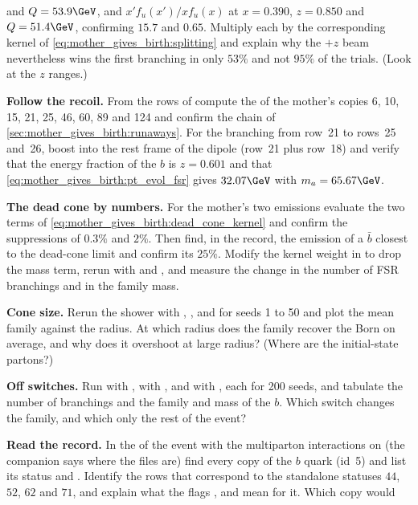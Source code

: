 \begin{exercises}
  and $Q=53.9\GeV$, and $x'f_u(x')/xf_u(x)$ at $x=0.390$, $z=0.850$ and
  $Q=51.4\GeV$, confirming $15.7$ and $0.65$. Multiply each by the
  corresponding kernel of \cref{eq:mother_gives_birth:splitting} and explain
  why the $+z$ beam nevertheless wins the first branching in only $53\%$ and
  not $95\%$ of the trials. (Look at the $z$ ranges.)
\item \textbf{Follow the recoil.} From the rows of 
  compute the \pt of the mother's copies 6, 10, 15, 21, 25, 46, 60, 89 and
  124 and confirm the chain of \cref{sec:mother_gives_birth:runaways}. For
  the branching from row~21 to rows~25 and~26, boost into the rest frame of
  the dipole (row~21 plus row~18) and verify that the energy fraction of the
  $b$ is $z=0.601$ and that
  \cref{eq:mother_gives_birth:pt_evol_fsr} gives $32.07\GeV$ with
  $m_a=65.67\GeV$.
\item \textbf{The dead cone by numbers.} For the mother's two emissions
  evaluate the two terms of \cref{eq:mother_gives_birth:dead_cone_kernel}
  and confirm the suppressions of $0.3\%$ and $2\%$. Then find, in
  the record, the emission of a $\bar b$ closest to the dead-cone limit
  and confirm its $25\%$.
  Modify the kernel weight in  to drop the mass term,
  rerun with  and , and measure the change
  in the number of FSR branchings and in the family mass.
\item \textbf{Cone size.} Rerun the shower with ,
  ,  and  for seeds 1 to 50 and plot the mean
  family \pt against the radius. At which radius does the family recover the
  Born \pt on average, and why does it overshoot at large radius? (Where are
  the initial-state partons?)
\item \textbf{Off switches.} Run with , with
  , and with , each for 200 seeds, and
  tabulate the number of branchings and the family \pt and mass of the $b$.
  Which switch changes the family, and which only the rest of the event?
\item \textbf{Read the \CMSSW record.} In the  of the
  \CMSSW event with the multiparton interactions on (the companion says
  where the files are) find every copy of the $b$ quark (id~5) and list its
  status and \pt. Identify
  the rows that correspond to the standalone statuses $44$, $52$, $62$ and
  $71$, and explain what the flags ,
   and  mean for it. Which copy would

\end{exercises}
